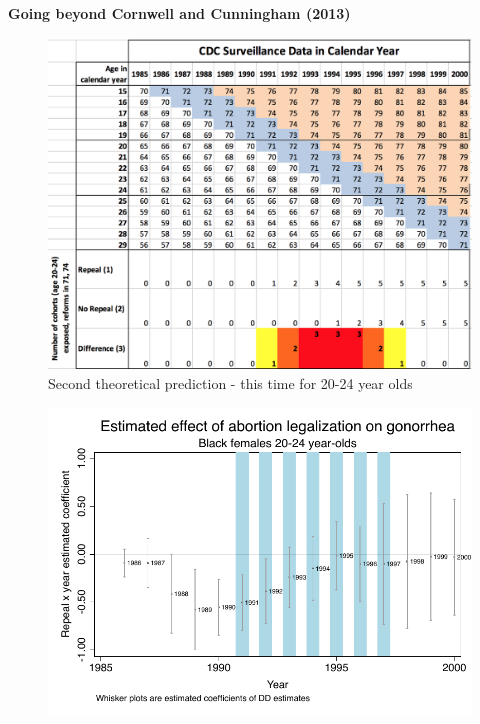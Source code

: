 \documentclass[notes=show]{beamer}
\begin{document}
\begin{frame}[plain]
\begin{center}
\textbf{Going beyond Cornwell and Cunningham (2013)}
\end{center}

	\begin{figure}
	\includegraphics[scale=0.2]{./lecture_includes/cohort_id2}
	\caption{Second theoretical prediction - this time for 20-24 year olds}
	\end{figure}

\end{frame}

\begin{frame}[plain]

	\begin{figure}
	\includegraphics[scale=0.7]{./lecture_includes/bf20_dd.pdf}
	\end{figure}

\end{frame}
\end{document}
